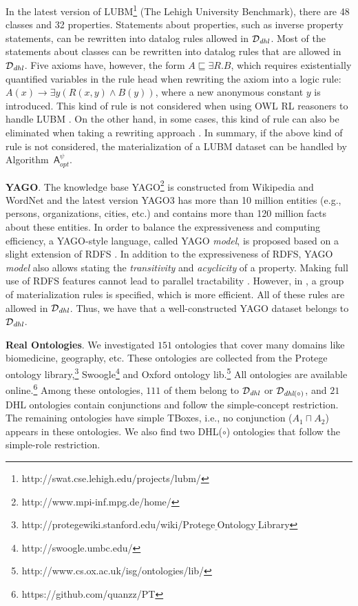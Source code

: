 \documentclass[final,1p,times]{elsarticle}
\begin{document}
In the latest version of LUBM\footnote{http://swat.cse.lehigh.edu/projects/lubm/}
(The Lehigh University Benchmark),
there are 48 classes and 32 properties.
Statements about properties, such as inverse property statements,
can be rewritten into datalog rules allowed in $\mathcal{D}_{\textit{\text{dhl}}}$.
Most of the statements about classes can be rewritten into datalog rules that
are allowed in $\mathcal{D}_{\textit{\text{dhl}}}$.
Five axioms have, however, the form $A\sqsubseteq\exists R.B$,
which requires existentially quantified variables in the rule head when rewriting
the axiom into a logic rule: $A(x)\rightarrow\exists y(R(x,y)\wedge B(y))$,
where a new anonymous constant $y$ is introduced.
This kind of rule is not considered when using OWL RL reasoners to handle LUBM \cite{UrbaniKMHB12,WeaverH09}.
On the other hand, in some cases, this kind of rule can also be
eliminated when taking a rewriting approach \cite{GrauHKKMMW13}.
In summary, if the above kind of rule is not considered,
the materialization of a LUBM dataset can be handled by Algorithm~$\mathsf{A}_{opt}^{\psi}$.

\textbf{YAGO}. The knowledge base YAGO\footnote{http://www.mpi-inf.mpg.de/home/}
is constructed from Wikipedia and WordNet and the latest version
YAGO3 \cite{MahdisoltaniBS15} has more than 10 million entities
(e.g., persons, organizations, cities, etc.)
and contains more than 120 million facts about these entities.
In order to balance the expressiveness and computing efficiency,
a YAGO-style language, called YAGO \emph{model}, is proposed based on
a slight extension of RDFS \cite{SuchanekKW08}.
In addition to the expressiveness of RDFS,
YAGO \emph{model} also allows stating the \emph{transitivity} and \emph{acyclicity} of a property.
Making full use of RDFS features cannot lead to parallel tractability \cite{Horst05}.
However, in \cite{SuchanekKW08}, a group of materialization rules
is specified, which is more efficient.
All of these rules are allowed in $\mathcal{D}_{\textit{\text{dhl}}}$.
Thus, we have that a well-constructed YAGO dataset belongs to $\mathcal{D}_{\textit{\text{dhl}}}$.

\textbf{Real Ontologies}. We investigated
$151$ ontologies that cover many domains
like biomedicine, geography, etc.
These ontologies are collected
from the Protege ontology library,\footnote{http://protegewiki.stanford.edu/wiki/Protege$\underline{~}$Ontology$\underline{~}$Library}
Swoogle\footnote{http://swoogle.umbc.edu/}
and Oxford ontology lib.\footnote{http://www.cs.ox.ac.uk/isg/ontologies/lib/}
All ontologies are available online.\footnote{https://github.com/quanzz/PT}
Among these ontologies, $111$ of them belong to $\mathcal{D}_{\textit{\text{dhl}}}$
or $\mathcal{D}_{\textit{\text{dhl}}(\circ)}$, and $21$ DHL ontologies contain
conjunctions and follow the simple-concept restriction.
The remaining ontologies have simple TBoxes, i.e., no conjunction ($A_1\sqcap A_2$)
appears in these ontologies.
We also find two DHL($\circ$) ontologies
that follow the simple-role restriction.
\end{document}
